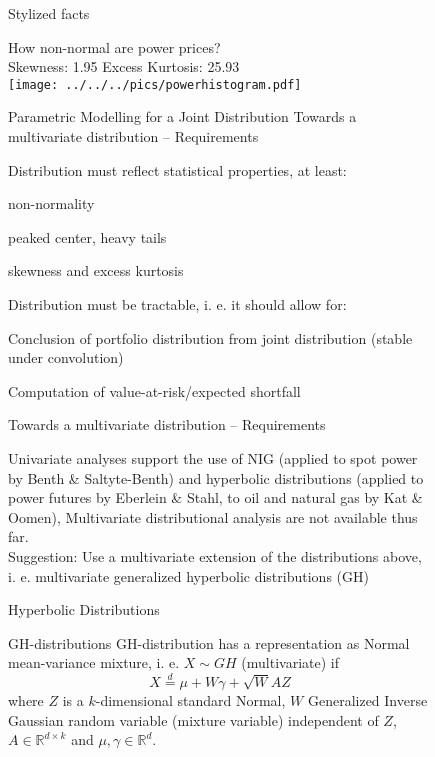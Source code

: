 \begin{figure}[htp]
Stylized facts %


\begin{center}
How non-normal are power prices?\\
 Skewness: 1.95 \hspace{2cm} Excess Kurtosis: 25.93\\
 \texttt{[image: ../../../pics/powerhistogram.pdf]} 
\par\end{center}



\subsectionMultivariate Parametric Modelling \subsubsectionRequirements for a Joint Distribution
Towards a multivariate distribution -- Requirements %


Distribution must reflect statistical properties, at least: 

non-normality 

peaked center, heavy tails 

skewness and excess kurtosis 

Distribution must be tractable, i. e. it should allow for: 

Conclusion of portfolio distribution from joint distribution (stable
under convolution) 

Computation of value-at-risk/expected shortfall 



Towards a multivariate distribution -- Requirements

Univariate analyses support the use of NIG (applied to spot power
by Benth \& Saltyte-Benth) and hyperbolic distributions (applied to
power futures by Eberlein \& Stahl, to oil and natural gas by Kat
\& Oomen), Multivariate distributional analysis are not available
thus far.\\


Suggestion: Use a multivariate extension of the distributions above,
i. e. multivariate generalized hyperbolic distributions (GH)

 \subsubsectionGeneralized Hyperbolic Distributions

GH-distributions GH-distribution has a representation as Normal
mean-variance mixture, i. e. $X\sim GH$ (multivariate) if 
$$
X\stackrel{d}{=}\mu+W\gamma+\sqrt{W}AZ
$$
where $Z$ is a $k$-dimensional standard Normal, $W$ Generalized
Inverse Gaussian random variable (mixture variable) independent of
$Z$, $A\in\mathbb{R}^{d\times k}$ and $\mu,\gamma\in\mathbb{R}^{d}$.


\end{figure}

